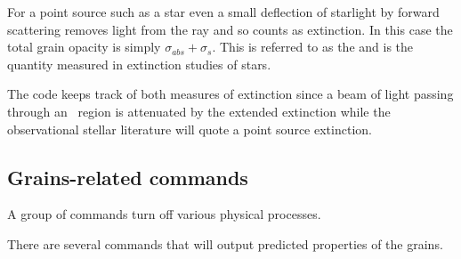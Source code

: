 For a point source such as a star even a small deflection of
starlight by forward scattering removes light from the ray
and so counts as extinction.
In this case the total grain opacity is simply
$\sigma_{abs} + \sigma_s$.
This is referred
to as the  and is the quantity
measured in extinction studies of stars.

The code keeps track of both measures of extinction since a beam of light
passing through an \hii\ region is attenuated by the extended extinction
while the observational stellar literature will quote a point source
extinction.

\subsection{Grains-related commands}

A group of  commands
turn off various physical processes.

There are several  commands that
will output predicted properties
of the grains.

